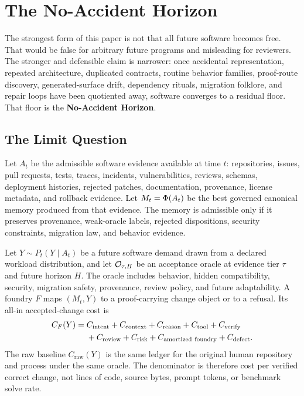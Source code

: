 \section{The No-Accident Horizon}
\label{sec:no-accident-horizon}

The strongest form of this paper is not that all future software becomes free. That would be false for arbitrary future programs and misleading for reviewers. The stronger and defensible claim is narrower: once accidental representation, repeated architecture, duplicated contracts, routine behavior families, proof-route discovery, generated-surface drift, dependency rituals, migration folklore, and repair loops have been quotiented away, software converges to a residual floor. That floor is the \textbf{No-Accident Horizon}.

\subsection{The Limit Question}

Let $A_t$ be the admissible software evidence available at time $t$: repositories, issues, pull requests, tests, traces, incidents, vulnerabilities, reviews, schemas, deployment histories, rejected patches, documentation, provenance, license metadata, and rollback evidence. Let $M_t=\Phi(A_t)$ be the best governed canonical memory produced from that evidence. The memory is admissible only if it preserves provenance, weak-oracle labels, rejected dispositions, security constraints, migration law, and behavior evidence.

Let $Y\sim P_t(Y\mid A_t)$ be a future software demand drawn from a declared workload distribution, and let $\mathcal{O}_{\tau,H}$ be an acceptance oracle at evidence tier $\tau$ and future horizon $H$. The oracle includes behavior, hidden compatibility, security, migration safety, provenance, review policy, and future adaptability. A foundry $F$ maps $(M_t,Y)$ to a proof-carrying change object or to a refusal. Its all-in accepted-change cost is
\begin{align}
C_F(Y)={}&C_{\mathrm{intent}}+C_{\mathrm{context}}+C_{\mathrm{reason}}+C_{\mathrm{tool}}
        +C_{\mathrm{verify}} \notag\\
&+C_{\mathrm{review}}+C_{\mathrm{risk}}+C_{\mathrm{amortized\ foundry}}
        +C_{\mathrm{defect}} .
\label{eq:nah-cost-ledger}
\end{align}
The raw baseline $C_{\mathrm{raw}}(Y)$ is the same ledger for the original human repository and process under the same oracle. The denominator is therefore cost per verified correct change, not lines of code, source bytes, prompt tokens, or benchmark solve rate.

